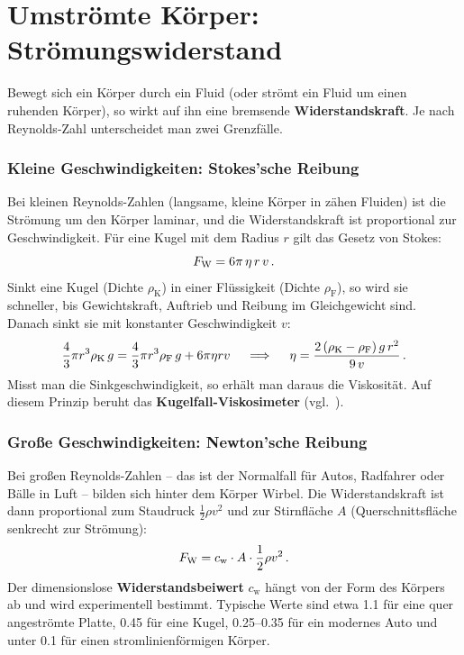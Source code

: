 \section{Umströmte Körper: Strömungswiderstand}\label{sec: stroemungswiderstand}
Bewegt sich ein Körper durch ein Fluid (oder strömt ein Fluid um einen ruhenden Körper), so wirkt auf ihn eine bremsende \textbf{Widerstandskraft}. Je nach Reynolds-Zahl unterscheidet man zwei Grenzfälle.

\subsubsection*{Kleine Geschwindigkeiten: Stokes'sche Reibung}
Bei kleinen Reynolds-Zahlen (langsame, kleine Körper in zähen Fluiden) ist die Strömung um den Körper laminar, und die Widerstandskraft ist proportional zur Geschwindigkeit. Für eine Kugel mit dem Radius $r$ gilt das Gesetz von Stokes:
\begin{equation}\label{eq: stokes}
    F_\text{W} = 6\pi \, \eta \, r \, v \,.
\end{equation}
Sinkt eine Kugel (Dichte $\rho_\text{K}$) in einer Flüssigkeit (Dichte $\rho_\text{F}$), so wird sie schneller, bis Gewichtskraft, Auftrieb und Reibung im Gleichgewicht sind. Danach sinkt sie mit konstanter Geschwindigkeit $v$:
\begin{equation*}
    \frac{4}{3}\pi r^3 \rho_\text{K}\, g = \frac{4}{3}\pi r^3 \rho_\text{F}\, g + 6 \pi \eta r v \quad \implies \quad \eta = \frac{2\,(\rho_\text{K} - \rho_\text{F})\, g\, r^2}{9\, v} \,.
\end{equation*}
Misst man die Sinkgeschwindigkeit, so erhält man daraus die Viskosität. Auf diesem Prinzip beruht das \textbf{Kugelfall-Viskosimeter} (vgl.~\cite[S.~398]{Tipler2015}).

\subsubsection*{Große Geschwindigkeiten: Newton'sche Reibung}
Bei großen Reynolds-Zahlen -- das ist der Normalfall für Autos, Radfahrer oder Bälle in Luft -- bilden sich hinter dem Körper Wirbel. Die Widerstandskraft ist dann proportional zum Staudruck $\frac{1}{2}\rho v^2$ und zur Stirnfläche $A$ (Querschnittsfläche senkrecht zur Strömung):
\begin{equation}\label{eq: newton_widerstand}
    F_\text{W} = c_\text{w} \cdot A \cdot \frac{1}{2}\rho v^2 \,.
\end{equation}
Der dimensionslose \textbf{Widerstandsbeiwert} $c_\text{w}$ hängt von der Form des Körpers ab und wird experimentell bestimmt. Typische Werte sind etwa \num{1.1} für eine quer angeströmte Platte, \num{0.45} für eine Kugel, \numrange{0.25}{0.35} für ein modernes Auto und unter \num{0.1} für einen stromlinienförmigen Körper.

